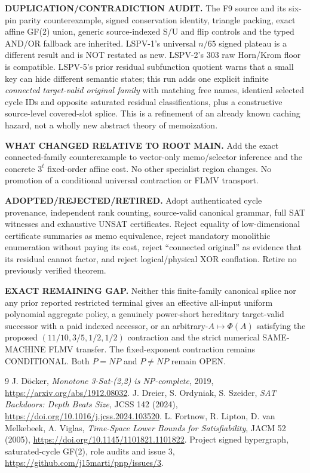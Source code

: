 \documentclass[11pt]{article}
\begin{document}
\noindent\textbf{DUPLICATION/CONTRADICTION AUDIT.} The F9 source and its six-pin parity counterexample, signed conservation identity, triangle packing, exact affine GF(2) union, generic source-indexed S/U and flip controls and the typed AND/OR fallback are inherited. LSPV-1's universal $n/65$ signed plateau is a different result and is NOT restated as new. LSPV-2's 303 raw Horn/Krom floor is compatible. LSPV-5's prior residual subfunction quotient warns that a small key can hide different semantic states; this run adds one explicit infinite \emph{connected target-valid original family} with matching free names, identical selected cycle IDs and opposite saturated residual classifications, plus a constructive source-level covered-slot splice. This is a refinement of an already known caching hazard, not a wholly new abstract theory of memoization.

\noindent\textbf{WHAT CHANGED RELATIVE TO ROOT MAIN.} Add the exact connected-family counterexample to vector-only memo/selector inference and the concrete $3^t$ fixed-order affine cost. No other specialist region changes. No promotion of a conditional universal contraction or FLMV transport.

\noindent\textbf{ADOPTED/REJECTED/RETIRED.} Adopt authenticated cycle provenance, independent rank counting, source-valid canonical grammar, full SAT witnesses and exhaustive UNSAT certificates. Reject equality of low-dimensional certificate summaries as memo equivalence, reject mandatory monolithic enumeration without paying its cost, reject ``connected original'' as evidence that its residual cannot factor, and reject logical/physical XOR conflation. Retire no previously verified theorem.

\noindent\textbf{EXACT REMAINING GAP.} Neither this finite-family canonical splice nor any prior reported restricted terminal gives an effective all-input uniform polynomial aggregate policy, a genuinely power-short hereditary target-valid successor with a paid indexed accessor, or an arbitrary-$A\mapsto\Phi(A)$ satisfying the proposed $(11/10,3/5,1/2,1/2)$ contraction and the strict numerical SAME-MACHINE FLMV transfer. The fixed-exponent contraction remains CONDITIONAL. Both $P=NP$ and $P\ne NP$ remain OPEN.

\begin{thebibliography}{9}
 J. D\"ocker, \emph{Monotone 3-Sat-(2,2) is NP-complete}, 2019, \url{https://arxiv.org/abs/1912.08032}.
 J. Dreier, S. Ordyniak, S. Szeider, \emph{SAT Backdoors: Depth Beats Size}, JCSS 142 (2024), \url{https://doi.org/10.1016/j.jcss.2024.103520}.
 L. Fortnow, R. Lipton, D. van Melkebeek, A. Viglas, \emph{Time-Space Lower Bounds for Satisfiability}, JACM 52 (2005), \url{https://doi.org/10.1145/1101821.1101822}.
 Project signed hypergraph, saturated-cycle GF(2), role audits and issue 3, \url{https://github.com/j15marti/pnp/issues/3}.
\end{thebibliography}
\end{document}

